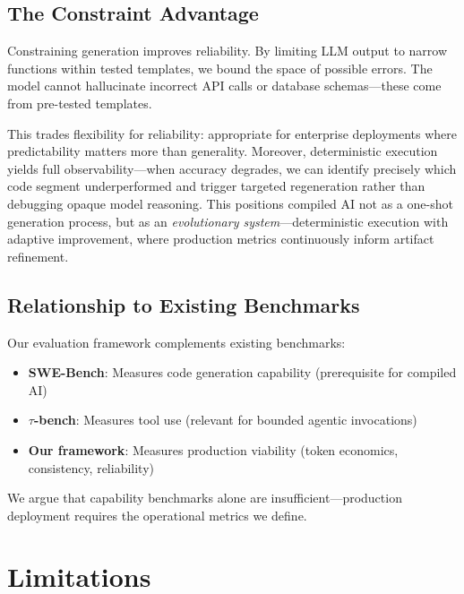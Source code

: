 \documentclass[11pt]{article}
\begin{document}
\subsection{The Constraint Advantage}

Constraining generation improves reliability. By limiting LLM output to narrow functions within tested templates, we bound the space of possible errors. The model cannot hallucinate incorrect API calls or database schemas—these come from pre-tested templates.

This trades flexibility for reliability: appropriate for enterprise deployments where predictability matters more than generality. Moreover, deterministic execution yields full observability—when accuracy degrades, we can identify precisely which code segment underperformed and trigger targeted regeneration rather than debugging opaque model reasoning. This positions compiled AI not as a one-shot generation process, but as an \emph{evolutionary system}—deterministic execution with adaptive improvement, where production metrics continuously inform artifact refinement.

\subsection{Relationship to Existing Benchmarks}

Our evaluation framework complements existing benchmarks:
\begin{itemize}
    \item \textbf{SWE-Bench}: Measures code generation capability (prerequisite for compiled AI)
    \item \textbf{$\tau$-bench}: Measures tool use (relevant for bounded agentic invocations)
    \item \textbf{Our framework}: Measures production viability (token economics, consistency, reliability)
\end{itemize}

We argue that capability benchmarks alone are insufficient—production deployment requires the operational metrics we define.

\section{Limitations}
\label{sec:limitations}
\end{document}
